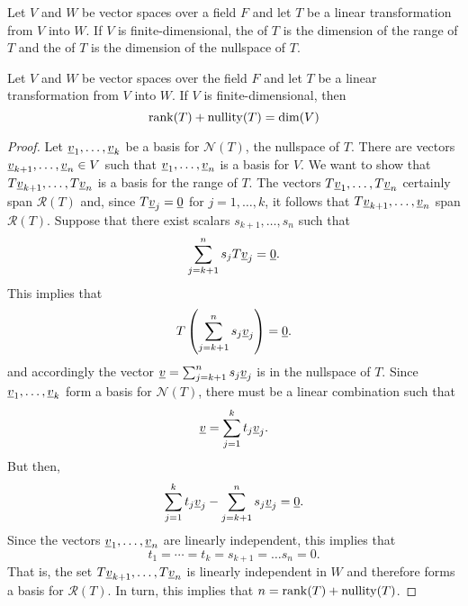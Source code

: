 \begin{definition}
Let $V$ and $W$ be vector spaces over a field $F$ and let $T$ be a linear transformation from $V$ into $W$.
If $V$ is finite-dimensional, the  of $T$ is the dimension of the range of $T$ and the  of $T$ is the dimension of the nullspace of $T$.
\end{definition}

\begin{theorem}
Let $V$ and $W$ be vector spaces over the field $F$ and let $T$ be a linear transformation from $V$ into $W$.
If $V$ is finite-dimensional, then
\begin{equation*}
\mathrm{rank} (T) + \mathrm{nullity} (T) = \dim (V)
\end{equation*}
\end{theorem}
\begin{proof}
Let $\underline{v}_1, \ldots, \underline{v}_k$ be a basis for $\mathcal{N}(T)$, the nullspace of $T$.
There are vectors $\underline{v}_{k+1}, \ldots, \underline{v}_n \in V$ such that $\underline{v}_1, \ldots, \underline{v}_n$ is a basis for $V$.
We want to show that $T \underline{v}_{k+1}, \ldots, T \underline{v}_n$ is a basis for the range of $T$.
The vectors $T \underline{v}_1, \ldots, T \underline{v}_n$ certainly span $\mathcal{R}(T)$ and, since $T \underline{v}_j = \underline{0}$ for $j = 1, \ldots, k$, it follows that $T \underline{v}_{k+1}, \ldots, \underline{v}_n$ span $\mathcal{R}(T)$.
Suppose that there exist scalars $s_{k+1}, \ldots, s_n$ such that
\begin{equation*}
\sum_{j=k+1}^n s_j T \underline{v}_j = \underline{0}.
\end{equation*}
This implies that
\begin{equation*}
T \left( \sum_{j=k+1}^n s_j \underline{v}_j \right) = \underline{0}.
\end{equation*}
and accordingly the vector $\underline{v} = \sum_{j=k+1}^n s_j \underline{v}_j$ is in the nullspace of $T$.
Since $\underline{v}_1, \ldots, \underline{v}_k$ form a basis for $\mathcal{N}(T)$, there must be a linear combination such that
\begin{equation*}
\underline{v} = \sum_{j=1}^k t_j \underline{v}_j .
\end{equation*}
But then,
\begin{equation*}
\sum_{j=1}^k t_j \underline{v}_j - \sum_{j=k+1}^n s_j \underline{v}_j = \underline{0}.
\end{equation*}
Since the vectors $\underline{v}_1, \ldots, \underline{v}_n$ are linearly independent, this implies that
\begin{equation*}
t_1 = \cdots = t_k = s_{k+1} = \hdots s_n = 0.
\end{equation*}
That is, the set $T \underline{v}_{k+1}, \ldots, T \underline{v}_n$ is linearly independent in $W$ and therefore forms a basis for $\mathcal{R}(T)$.
In turn, this implies that $n = \mathrm{rank}(T) + \mathrm{nullity}(T)$.
\end{proof}

